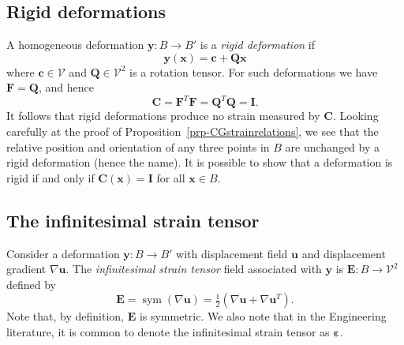 \documentclass[
  letterpaper,
  DIV=11,
  numbers=noendperiod]{scrreprt}
\theoremstyle{plain}
\theoremstyle{remark}
\begin{document}
\subsection{Rigid deformations}\label{rigid-deformations}

A homogeneous deformation \({\boldsymbol{y}}:B\to B'\) is a \emph{rigid
deformation} if
\[{\boldsymbol{y}}({\boldsymbol{x}}) = {\boldsymbol{c}}+{\boldsymbol{Q}}{\boldsymbol{x}}\]
where \({\boldsymbol{c}}\in{\mathcal{V}}\) and
\({\boldsymbol{Q}}\in{\mathcal{V}}^2\) is a rotation tensor. For such
deformations we have \({\boldsymbol{F}}={\boldsymbol{Q}}\), and hence
\[{\boldsymbol{C}}= {\boldsymbol{F}}^T{\boldsymbol{F}}= {\boldsymbol{Q}}^T{\boldsymbol{Q}}= {\boldsymbol{I}}.\]
It follows that rigid deformations produce no strain measured by
\({\boldsymbol{C}}\). Looking carefully at the proof of
Proposition~\ref{prp-CGstrainrelations}, we see that the relative
position and orientation of any three points in \(B\) are unchanged by a
rigid deformation (hence the name). It is possible to show that a
deformation is rigid if and only if
\({\boldsymbol{C}}({\boldsymbol{x}})={\boldsymbol{I}}\) for all
\({\boldsymbol{x}}\in B\).

\subsection{The infinitesimal strain
tensor}\label{the-infinitesimal-strain-tensor}

Consider a deformation \({\boldsymbol{y}}:B\to B'\) with displacement
field \({\boldsymbol{u}}\) and displacement gradient
\(\nabla {\boldsymbol{u}}\). The \emph{infinitesimal strain tensor}
field associated with \({\boldsymbol{y}}\) is
\({\boldsymbol{E}}:B\to{\mathcal{V}}^2\) defined by
\[{\boldsymbol{E}}= {\operatorname{sym}}(\nabla{\boldsymbol{u}}) = \tfrac12(\nabla{\boldsymbol{u}}+\nabla{\boldsymbol{u}}^T).\]
Note that, by definition, \({\boldsymbol{E}}\) is symmetric. We also
note that in the Engineering literature, it is common to denote the
infinitesimal strain tensor as \(\boldsymbol{\varepsilon}\).
\end{document}
